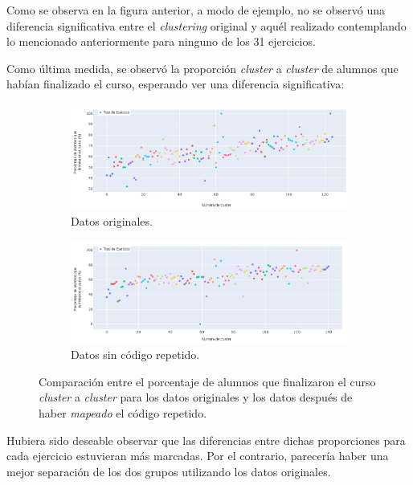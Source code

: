 \documentclass[11pt,a4paper,twoside,openany]{tesis}
\begin{document}
Como se observa en la figura anterior, a modo de ejemplo, no se observó una diferencia significativa entre el \emph{clustering} original y aquél realizado contemplando lo mencionado anteriormente para ninguno de los 31 ejercicios.

Como última medida, se observó la proporción \emph{cluster} a \emph{cluster} de alumnos que habían finalizado el curso, esperando ver una diferencia significativa:

\begin{figure}[H]
    \centering
    \begin{subfigure}{0.45\textwidth}
        \includegraphics[width=\linewidth]{imagenes/porcentaje - original.png}
        \caption{Datos originales.}
        \label{fig:figura5}
    \end{subfigure}
    \hfill
    \begin{subfigure}{0.45\textwidth}
        \includegraphics[width=\linewidth]{imagenes/porcentaje - unniques.png}
        \caption{Datos sin código repetido.}
        \label{fig:figura6}
    \end{subfigure}
    \caption{Comparación entre el porcentaje de alumnos que finalizaron el curso \emph{cluster} a \emph{cluster} para los datos originales y los datos después de haber \emph{mapeado} el código repetido.}
    \label{porcentajes}
\end{figure}

Hubiera sido deseable observar que las diferencias entre dichas proporciones para cada ejercicio estuvieran más marcadas. Por el contrario, parecería haber una mejor separación de los dos grupos utilizando los datos originales.
\end{document}
